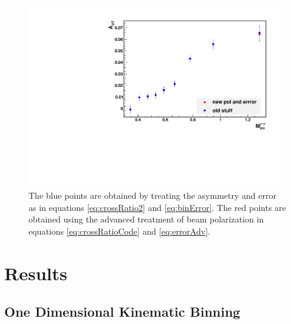 \documentclass[abstract = on,listof=totoc, bibliography=totoc]{scrreprt}
\begin{document}
\begin{figure}
\begin{center}
\includegraphics[width = .7\textwidth]{polarizationErrorTestM}
\caption[something]{The blue points are obtained by treating the asymmetry and error as in equations \ref{eq:crossRatio2} and \ref{eq:binError}. The red points are obtained using the advanced treatment of beam polarization in equations \ref{eq:crossRatioCode} and \ref{eq:errorAdv}.}
\label{fig:advPolTreat}
\end{center}
\end{figure}








 



















\chapter{Results}
\section{One Dimensional Kinematic Binning}
\end{document}
